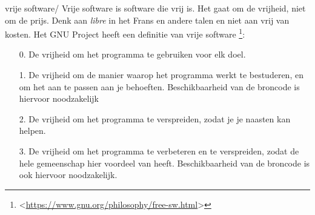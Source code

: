 \documentclass[11pt,a5paper,twoside]{book}
\newcommand{\BETEREURL}[1]{\mbox{<\url{#1}>}}
\begin{document}
  \begin{WOORD}{vrije software}{/}
   Vrije software is software die vrij is. Het gaat om de vrijheid, niet
    om de prijs. Denk aan \textit{libre} in het Frans en andere talen en niet
    aan vrij van kosten. Het GNU Project heeft een definitie van vrije software%
    \footnote{\BETEREURL{https://www.gnu.org/philosophy/free-sw.html}}:
   \begin{itemize}
    \item[0.]
     De vrijheid om het programma te gebruiken voor elk doel.
    \item[1.]
     De vrijheid om de manier waarop het programma werkt te bestuderen, en om het aan te passen aan je behoeften.
     Beschikbaarheid van de broncode is hiervoor noodzakelijk
    \item[2.]
     De vrijheid om het programma te verspreiden, zodat je je naasten kan helpen.
    \item[3.]
     De vrijheid om het programma te verbeteren en te verspreiden, zodat de hele gemeenschap hier voordeel van heeft.
     Beschikbaarheid van de broncode is ook hiervoor noodzakelijk.
   \end{itemize}
  \end{WOORD}
\label{EINDE}
\end{document}
